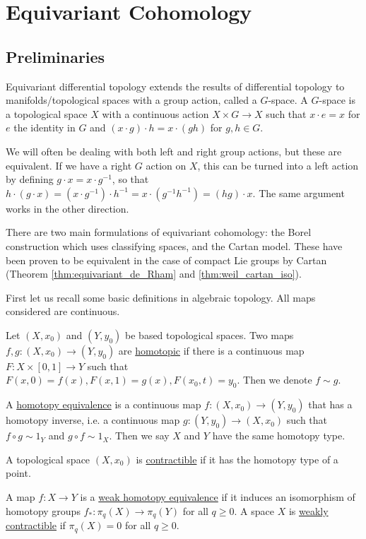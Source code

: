 \chapter{Equivariant Cohomology}
\label{chapter2}

\section{Preliminaries}
Equivariant differential topology extends the results of differential topology
to manifolds/topological spaces with a group action, called a $G$-space. A
$G$-space is a topological space $X$ with a continuous action $X\times G \to X$ 
such that $x\cdot e = x$ for $e$ the identity in  $G$ and $(x\cdot g) \cdot h =
x\cdot (gh)$ for $g,h\in G$. 

We will often be dealing with both left and right group actions, but these are
equivalent. If we have a right $G$ action on $X$, this can be turned into a left
action by defining  $g \cdot x = x \cdot g^{-1}$, so that $h\cdot (g\cdot x) =
(x\cdot g^{-1})\cdot h^{-1} = x\cdot (g^{-1}h^{-1}) = (hg)\cdot x$. The same
argument works in the other direction.


There are two main formulations of equivariant
cohomology: the Borel construction which uses classifying spaces, and the Cartan model.
These have been proven to be equivalent in the case of compact Lie groups 
by Cartan (Theorem \ref{thm:equivariant_de_Rham} and \ref{thm:weil_cartan_iso}). 

First let us recall some basic definitions in algebraic topology. All maps
considered are continuous.
\begin{defn}
	Let $(X,x_0)$ and $(Y,y_0)$ be based topological spaces. Two maps
	$f,g:(X,x_0)\to(Y,y_0)$ are \underline{homotopic} if there is a continuous
	map $F:X\times [0,1]\to Y$ such that
	$F(x,0)=f(x),F(x,1)=g(x),F(x_0,t)=y_0$. Then we denote $f\sim g$.

	A \underline{homotopy equivalence} is a continuous map $f:(X,x_0)\to(Y,y_0)$
	that has a homotopy inverse, i.e. a continuous map $g:(Y,y_0)\to(X,x_0)$
	such that $f\circ g \sim 1_Y$ and $g\circ f \sim 1_X$.
	Then we say $X$ and  $Y$ have the same homotopy type.

	A topological space $(X,x_0)$ is \underline{contractible} if it has the
	homotopy type of a point. 

	A map $f:X\to Y$ is a \underline{weak homotopy equivalence} if
	it induces an isomorphism of homotopy groups
	$f_*:\pi_q(X)\to\pi_q(Y)$ for all  $q\geq 0$. 
	A space $X$ is \underline{weakly contractible} if $\pi_q(X)=0$ for all  $q\geq 0$. 
\end{defn}

